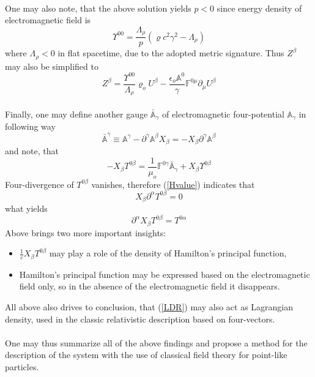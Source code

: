 \documentclass[aps,prx,preprint,groupedaddress,showkeys]{revtex4-2}
\begin{document}
~\\
One may also note, that the above solution yields $p < 0$ since energy density of electromagnetic field is
\begin{equation} \label{HQ4g}
\Upsilon^{0 0} = \frac{\Lambda_{\rho}}{p} \left (  \varrho c^2 \gamma ^2 - \Lambda_{\rho} \right )
\end{equation}
where $\Lambda_{\rho} < 0$ in flat spacetime, due to the adopted metric signature. Thus $Z^{\beta}$ may also be simplified to
\begin{equation} \label{HQ4h}
Z^{\beta} = \frac{\Upsilon^{0 0}}{\Lambda_{\rho}} \varrho_o U^{\beta} - \frac{\epsilon_o \mathbb{A}^0}{\gamma} \mathbb{F}^{0 \mu} \partial_{\mu} U^{\beta}
\end{equation}
~\\
Finally, one may define another gauge $\bar{\mathbb{A}}_{\gamma}$ of electromagnetic four-potential $\mathbb{A}_{\gamma}$ in following way
\begin{equation} \label{HQ6}
\bar{\mathbb{A}}^{\gamma} \equiv  \mathbb{A}^{\gamma} - \partial^{\gamma} \mathbb{A}^{\beta}X_{\beta} = - X_{\beta} \partial^{\gamma} \mathbb{A}^{\beta}
\end{equation}
and note, that
\begin{equation} \label{HQ7}
- X_{\beta} T^{0 \beta} =  \frac{1}{\mu_o} \mathbb{F}^{0 \gamma} \bar{\mathbb{A}}_{\gamma} + X_{\beta} \Upsilon^{0 \beta}
\end{equation}
Four-divergence of $T^{0 \beta}$ vanishes, therefore (\ref{Hvalue}) indicates that
\begin{equation} \label{HQ8}
X_{\beta} \partial^{\alpha} T^{0 \beta} = 0
\end{equation}
what yields
\begin{equation} \label{HQ9}
\partial^{\alpha} X_{\beta} T^{0 \beta} =  T^{0 \alpha}
\end{equation}
Above brings two more important insights: 
\begin{itemize}
  \item $\frac{1}{c}X_{\beta} T^{0 \beta}$ may play a role of the density of Hamilton's principal function,
  \item Hamilton's principal function may be expressed based on the electromagnetic field only, so in the absence of the electromagnetic field it disappears.
\end{itemize}
All above also drives to conclusion, that (\ref{LDR}) may also act as Lagrangian density, used in the classic relativistic description based on four-vectors. \\
~\\
One may thus summarize all of the above findings and propose a method for the description of the system with the use of classical field theory for point-like particles. 
\end{document}
